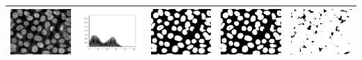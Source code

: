 \documentclass[11pt]{report}
\begin{document}
\begin{table}[htbp]
{\begin{tabular}{|c|c|c|c|c|}
        \includegraphics[width=5cm]{Nuclei.png}    & \includegraphics[width=5cm]{Nuclei_Hist.png}    & \includegraphics[width=5cm]{Nuclei_Otsu.png}    & \includegraphics[width=5cm]{Nuclei_Isodata.png}    & \includegraphics[width=5cm]{Nuclei_Triangle.png}    \\
        \hline

\end{tabular}}
\end{table}
\end{document}
